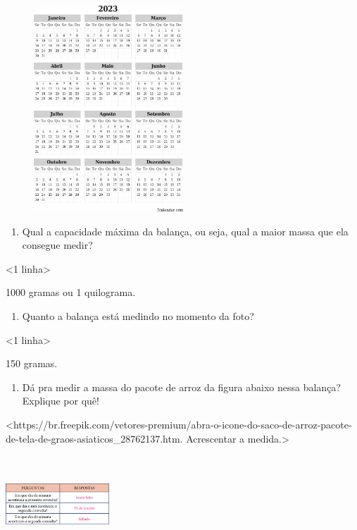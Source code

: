 \includegraphics[width=3.04167in,height=3.04167in]{media/image52.png}

\begin{enumerate}
\def\labelenumi{\alph{enumi})}
\item
  Qual a capacidade máxima da balança, ou seja, qual a maior massa que
  ela consegue medir?
\end{enumerate}

\textless{}1 linha\textgreater{}

1000 gramas ou 1 quilograma.

\begin{enumerate}
\def\labelenumi{\alph{enumi})}
\item
  Quanto a balança está medindo no momento da foto?
\end{enumerate}

\textless{}1 linha\textgreater{}

150 gramas.

\begin{enumerate}
\def\labelenumi{\alph{enumi})}
\item
  Dá pra medir a massa do pacote de arroz da figura abaixo nessa
  balança? Explique por quê!
\end{enumerate}

\textless{}https://br.freepik.com/vetores-premium/abra-o-icone-do-saco-de-arroz-pacote-de-tela-de-graos-asiaticos\_28762137.htm.
Acrescentar a medida.\textgreater{}

\includegraphics[width=1.53125in,height=1.43597in]{media/image53.png}

